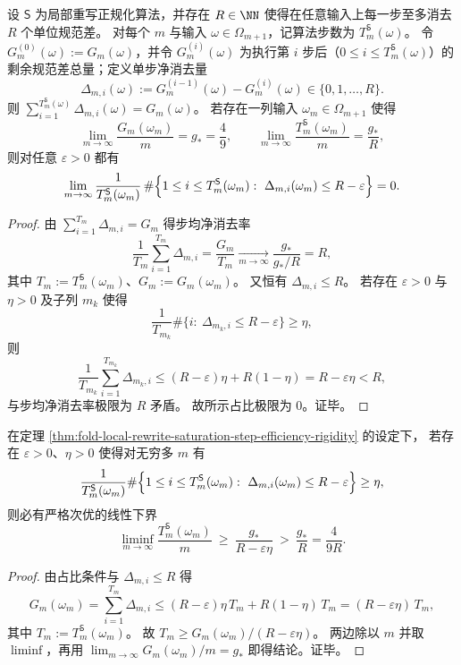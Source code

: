 \begin{theorem}\label{thm:fold-local-rewrite-saturation-step-efficiency-rigidity}
设 \(\mathsf S\) 为局部重写正规化算法，并存在 \(R\in\NN\) 使得在任意输入上每一步至多消去 \(R\) 个单位规范差。
对每个 \(m\) 与输入 \(\omega\in\Omega_{m+1}\)，记算法步数为 \(T_m^{\mathsf S}(\omega)\)。
令 \(G_{m}^{(0)}(\omega):=G_m(\omega)\)，并令 \(G_m^{(i)}(\omega)\) 为执行第 \(i\) 步后（\(0\le i\le T_m^{\mathsf S}(\omega)\)）的剩余规范差总量；定义单步净消去量
\[
\Delta_{m,i}(\omega):=G_m^{(i-1)}(\omega)-G_m^{(i)}(\omega)\in\{0,1,\dots,R\}.
\]
则 \(\sum_{i=1}^{T_m^{\mathsf S}(\omega)}\Delta_{m,i}(\omega)=G_m(\omega)\)。
若存在一列输入 \(\omega_m\in\Omega_{m+1}\) 使得
\[
\lim_{m\to\infty}\frac{G_m(\omega_m)}{m}=g_\ast=\frac49,
\qquad
\lim_{m\to\infty}\frac{T_m^{\mathsf S}(\omega_m)}{m}=\frac{g_\ast}{R},
\]
则对任意 \(\varepsilon>0\) 都有
\[
\lim_{m\to\infty}\frac{1}{T_m^{\mathsf S}(\omega_m)}\,
\#\Bigl\{1\le i\le T_m^{\mathsf S}(\omega_m):\ \Delta_{m,i}(\omega_m)\le R-\varepsilon\Bigr\}=0.
\]
\end{theorem}
\begin{proof}
由 \(\sum_{i=1}^{T_m}\Delta_{m,i}=G_m\) 得步均净消去率
\[
\frac{1}{T_m}\sum_{i=1}^{T_m}\Delta_{m,i}=\frac{G_m}{T_m}\xrightarrow[m\to\infty]{}\frac{g_\ast}{g_\ast/R}=R,
\]
其中 \(T_m:=T_m^{\mathsf S}(\omega_m)\)、\(G_m:=G_m(\omega_m)\)。
又恒有 \(\Delta_{m,i}\le R\)。
若存在 \(\varepsilon>0\) 与 \(\eta>0\) 及子列 \(m_k\) 使得
\[
\frac{1}{T_{m_k}}\#\{i:\ \Delta_{m_k,i}\le R-\varepsilon\}\ge \eta,
\]
则
\[
\frac{1}{T_{m_k}}\sum_{i=1}^{T_{m_k}}\Delta_{m_k,i}
\le (R-\varepsilon)\eta+R(1-\eta)=R-\varepsilon\eta<R,
\]
与步均净消去率极限为 \(R\) 矛盾。
故所示占比极限为 \(0\)。证毕。
\end{proof}

\begin{corollary}[饱和失败的定量代价]\label{cor:fold-local-rewrite-saturation-failure-quantitative-cost}
在定理 \ref{thm:fold-local-rewrite-saturation-step-efficiency-rigidity} 的设定下，
若存在 \(\varepsilon>0\)、\(\eta>0\) 使得对无穷多 \(m\) 有
\[
\frac{1}{T_m^{\mathsf S}(\omega_m)}\#\Bigl\{1\le i\le T_m^{\mathsf S}(\omega_m):\ \Delta_{m,i}(\omega_m)\le R-\varepsilon\Bigr\}\ge \eta,
\]
则必有严格次优的线性下界
\[
\liminf_{m\to\infty}\frac{T_m^{\mathsf S}(\omega_m)}{m}\ \ge\ \frac{g_\ast}{R-\varepsilon\eta}\ >\ \frac{g_\ast}{R}=\frac{4}{9R}.
\]
\end{corollary}
\begin{proof}
由占比条件与 \(\Delta_{m,i}\le R\) 得
\[
G_m(\omega_m)=\sum_{i=1}^{T_m}\Delta_{m,i}
\le (R-\varepsilon)\eta\,T_m+R(1-\eta)\,T_m=(R-\varepsilon\eta)\,T_m,
\]
其中 \(T_m:=T_m^{\mathsf S}(\omega_m)\)。
故 \(T_m\ge G_m(\omega_m)/(R-\varepsilon\eta)\)。
两边除以 \(m\) 并取 \(\liminf\)，再用 \(\lim_{m\to\infty}G_m(\omega_m)/m=g_\ast\) 即得结论。证毕。
\end{proof}


